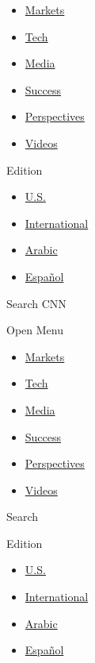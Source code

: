 \begin{itemize}
\tightlist
\item
  \href{https://money.cnn.com/data/markets/}{Markets}
\item
  \href{/business/tech}{Tech}
\item
  \href{/business/media}{Media}
\item
  \href{/business/success}{Success}
\item
  \href{/business/perspectives}{Perspectives}
\item
  \href{/business/videos}{Videos}
\end{itemize}

Edition

\begin{itemize}
\tightlist
\item
  \href{//us.cnn.com?hpt=header_edition-picker}{U.S.}
\item
  \href{//edition.cnn.com?hpt=header_edition-picker}{International}
\item
  \href{//arabic.cnn.com?hpt=header_edition-picker}{Arabic}
\item
  \href{//cnnespanol.cnn.com?hpt=header_edition-picker}{Español}
\end{itemize}

Search CNN

Open Menu

\begin{itemize}
\tightlist
\item
  \href{https://money.cnn.com/data/markets/}{Markets}
\item
  \href{/business/tech}{Tech}
\item
  \href{/business/media}{Media}
\item
  \href{/business/success}{Success}
\item
  \href{/business/perspectives}{Perspectives}
\item
  \href{/business/videos}{Videos}
\end{itemize}

Search

Edition

\begin{itemize}
\tightlist
\item
  \href{//us.cnn.com?hpt=header_edition-picker}{U.S.}
\item
  \href{//edition.cnn.com?hpt=header_edition-picker}{International}
\item
  \href{//arabic.cnn.com?hpt=header_edition-picker}{Arabic}
\item
  \href{//cnnespanol.cnn.com?hpt=header_edition-picker}{Español}
\end{itemize}

